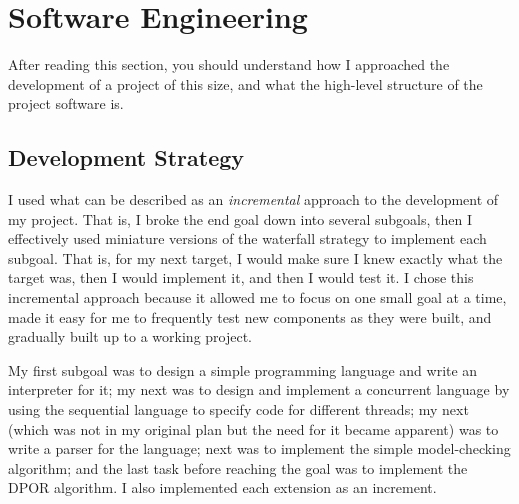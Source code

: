 \documentclass[12pt,a4paper,twoside,openright]{report}
\begin{document}
\section{Software Engineering}
After reading this section, you should
understand how I approached the
development of a project of this
size, and what the high-level
structure of the project software is.

\subsection{Development Strategy}
I used what can be described as an
\textit{incremental} approach to the
development of my project. That is,
I broke the end goal down into
several subgoals, then I effectively
used miniature versions of the waterfall
strategy to implement each subgoal. That
is, for my next target, I would make sure
I knew exactly what the target was, then
I would implement it, and then I would
test it.
I chose this incremental approach
because it allowed me to focus on one
small goal at a time, made it easy for
me to frequently test new components as
they were built, and gradually built up
to a working project.

My first subgoal was to design
a simple programming language and write an interpreter
for it; my next was to design and implement
a concurrent language
by using the sequential language to
specify code for different threads;
my next (which was not in my original plan but
the need for it became apparent) was to write
a parser for the language; next was to implement
the simple model-checking algorithm; and the
last task before reaching the goal was to
implement the DPOR algorithm. I also implemented
each extension as an increment.
\end{document}
